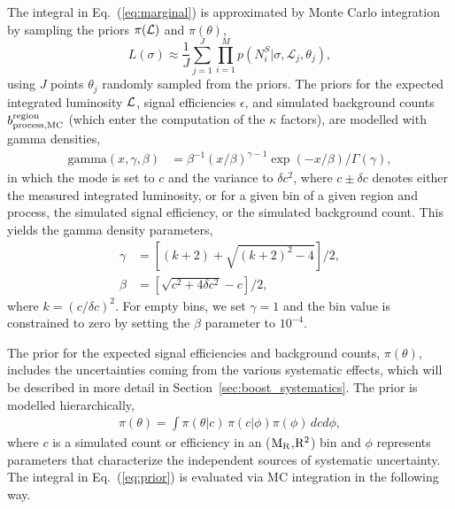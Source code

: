 The integral in Eq.~(\ref{eq:marginal}) is approximated by Monte Carlo integration by sampling
the priors $\pi({\cal L})$ and  $\pi(\theta)$, 
\begin{equation}
    L(\sigma) \approx \frac{1}{J} \sum_{j=1}^J \prod_{i=1}^{M}
    p(N^S_i| \sigma, \mathcal{L}_j, \theta_j),
\end{equation}
using $J$ points $\theta_j$ randomly sampled from the priors.
The priors for the expected integrated luminosity ${\cal L}$, signal efficiencies $\epsilon$, and 
simulated background counts $b^{\rm region}_{\rm process, MC}$ (which enter the computation of the
$\kappa$ factors), are modelled with gamma densities,
\begin{align}
\textrm{gamma}(x, \gamma, \beta) &= \beta^{-1}(x/\beta)^{\gamma-1} \exp(-x / \beta) /
\Gamma(\gamma),
\label{eq:gamma}
\end{align}
in which the mode is set to $c$ and the variance to $\delta c^2$, 
where $c \pm \delta c$ denotes either the measured integrated luminosity, or for a given bin of
a given region and process, the simulated signal efficiency, or the simulated background count. This
yields the gamma density parameters,
\begin{align}
   \gamma &= [(k + 2) + \sqrt{(k+2)^2 - 4}]/2,\\
   \beta &= [\sqrt{c^2 + 4\delta c^2} - c]/2,
\end{align}
where $k = (c / \delta c)^2$.
For empty bins, we set $\gamma = 1$ and the bin value is constrained to zero by setting the $\beta$
parameter to $10^{-4}$.

The prior for the expected signal efficiencies and background counts, $\pi(\theta)$, 
includes the uncertainties coming from the various systematic effects, which will be described in
more detail in Section~\ref{sec:boost_systematics}. 
The prior is modelled hierarchically, 
\begin{align}
  \pi(\theta) = \int \pi(\theta | c ) \, \pi(c | \phi ) \pi(\phi) \, dc d\phi,
  \label{eq:prior}
\end{align}
where $c$ is a simulated count or efficiency in an ($\mathrm{M_R}$,$\mathrm{R^2}$) bin and $\phi$ represents
parameters that characterize the independent sources of systematic uncertainty. 
The integral in Eq.~(\ref{eq:prior}) is evaluated via MC integration in the following way.

